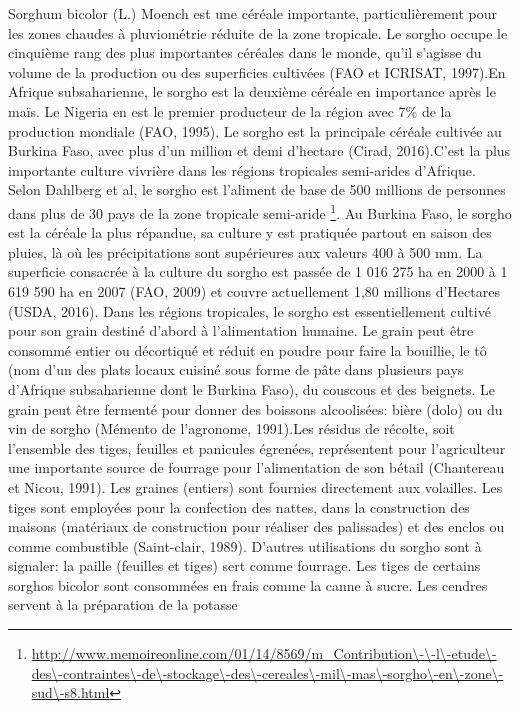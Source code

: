 \documentclass[a4paper,11pt]{article}
\begin{document}
Sorghum bicolor (L.) Moench est une céréale importante,
particulièrement pour les zones chaudes à pluviométrie réduite de la
zone tropicale. Le sorgho occupe le cinquième rang des plus
importantes céréales dans le monde, qu’il s’agisse du volume de la
production ou des superficies cultivées (FAO et ICRISAT, 1997).En
Afrique subsaharienne, le sorgho est la deuxième céréale en importance
après le maïs. Le Nigeria en est le premier producteur de la région
avec 7\% de la production mondiale (FAO, 1995). Le sorgho est la
principale céréale cultivée au Burkina Faso, avec plus d’un million et
demi d’hectare (Cirad, 2016).C’est la plus importante culture vivrière
dans les régions tropicales semi-arides d’Afrique. Selon Dahlberg et
al, le sorgho est l’aliment de base de 500 millions de personnes dans
plus de 30 pays de la zone tropicale semi-aride
\footnote{\url{http://www.memoireonline.com/01/14/8569/m_Contribution\-\-l\-etude\-des\-contraintes\-de\-stockage\-des\-cereales\-mil\-mas\-sorgho\-en\-zone\-sud\-s8.html}}.
Au Burkina Faso, le sorgho est la céréale la plus répandue, sa culture
y est pratiquée partout en saison des pluies, là où les précipitations
sont supérieures aux valeurs 400 à 500 mm. La superficie consacrée à
la culture du sorgho est passée de 1 016 275 ha en 2000 à 1 619 590 ha
en 2007 (FAO, 2009) et couvre actuellement 1,80 millions d’Hectares
(USDA, 2016). Dans les régions tropicales, le sorgho est
essentiellement cultivé pour son grain destiné d’abord à
l’alimentation humaine. Le grain peut être consommé entier ou
décortiqué et réduit en poudre pour faire la bouillie, le tô (nom d’un
des plats locaux cuisiné sous forme de pâte dans plusieurs pays
d’Afrique subsaharienne dont le Burkina Faso), du couscous et des
beignets. Le grain peut être fermenté pour donner des boissons
alcoolisées: bière (dolo) ou du vin de sorgho (Mémento de l’agronome,
1991).Les résidus de récolte, soit l’ensemble des tiges, feuilles et
panicules égrenées, représentent pour l’agriculteur une importante
source de fourrage pour l’alimentation de son bétail (Chantereau et
Nicou, 1991). Les graines (entiers) sont fournies directement aux
volailles. Les tiges sont employées pour la confection des nattes,
dans la construction des maisons (matériaux de construction pour
réaliser des palissades) et des enclos ou comme combustible
(Saint-clair, 1989). D’autres utilisations du sorgho sont à signaler:
la paille (feuilles et tiges) sert comme fourrage. Les tiges de
certains sorghos bicolor sont consommées en frais comme la canne à
sucre. Les cendres servent à la préparation de la potasse
\end{document}
